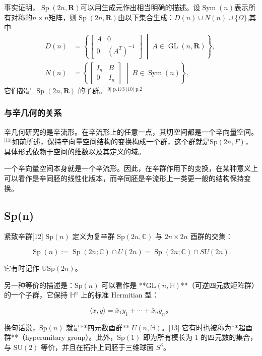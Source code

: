事实证明，$\operatorname{Sp}(2n, \mathbf{R})$可以用生成元作出相当明确的描述。设$\operatorname{Sym}(n)$表示所有对称的$n \times n$矩阵，则$\operatorname{Sp}(2n, \mathbf{R})$由以下集合生成：$D(n) \cup N(n) \cup \{\Omega\}$,其中
$$
\begin{aligned}
D(n) &= \left\{ 
\begin{bmatrix}
A & 0 \\
0 & (A^{T})^{-1}
\end{bmatrix}
\;\middle|\; A \in \operatorname{GL}(n, \mathbf{R})
\right\},\\
N(n) &= \left\{
\begin{bmatrix}
I_{n} & B \\
0 & I_{n}
\end{bmatrix}
\;\middle|\; B \in \operatorname{Sym}(n)
\right\},
\end{aligned}~
$$
它们都是 $\operatorname{Sp}(2n, \mathbf{R})$ 的子群。\(^\text{[9] p.173 [10] p.2}\)
\subsubsection{与辛几何的关系}
辛几何研究的是辛流形。在辛流形上的任意一点，其切空间都是一个辛向量空间。\(^\text{[11]}\)如前所述，保持辛向量空间结构的变换构成一个群，这个群就是$\mathrm{Sp}(2n, F)$，具体形式依赖于空间的维数以及其定义的域。

一个辛向量空间本身就是一个辛流形。因此，在辛群作用下的变换，在某种意义上可以看作是辛同胚的线性化版本，而辛同胚是辛流形上一类更一般的结构保持变换。
\subsection{Sp(n)}
紧致辛群[12] $\mathrm{Sp}(n)$ 定义为复辛群 $\mathrm{Sp}(2n, \mathbb{C})$ 与 $2n \times 2n$ 酉群的交集：

$$
\operatorname{Sp}(n) := \operatorname{Sp}(2n;\mathbb{C}) \cap U(2n) 
= \operatorname{Sp}(2n;\mathbb{C}) \cap SU(2n).
$$

它有时记作 $\mathrm{USp}(2n)$。

另一种等价的描述是：$\mathrm{Sp}(n)$ 可以看作是 **$\mathrm{GL}(n, \mathbb{H})$**（可逆四元数矩阵群）的一个子群，它保持 $\mathbb{H}^n$ 上的标准 Hermitian 型：

$$
\langle x, y \rangle = \bar{x}_1 y_1 + \cdots + \bar{x}_n y_n。
$$

换句话说，$\mathrm{Sp}(n)$ 就是**四元数酉群** $U(n, \mathbb{H})$。[13] 它有时也被称为**超酉群**（hyperunitary group）。此外，$\mathrm{Sp}(1)$ 即为所有模长为 1 的四元数的集合，与 $\mathrm{SU}(2)$ 等价，并且在拓扑上同胚于三维球面 $S^3$。

